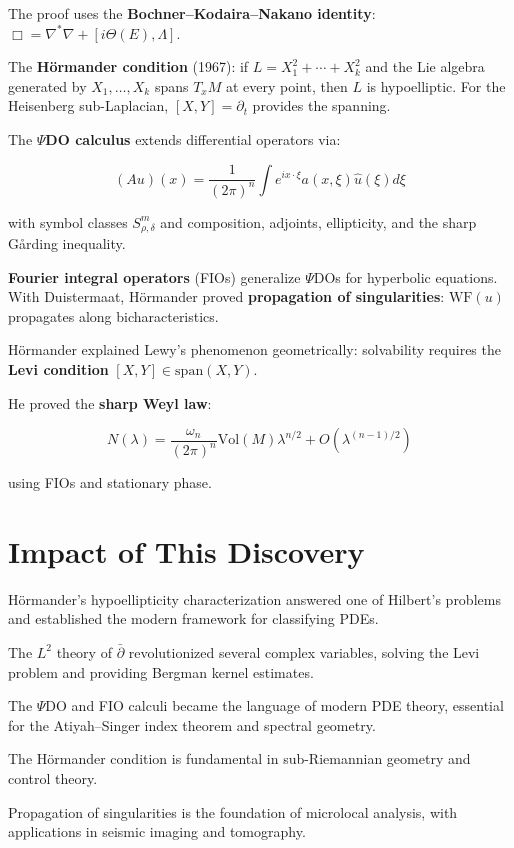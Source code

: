 The proof uses the \textbf{Bochner--Kodaira--Nakano identity}:
$\Box = \nabla^*\nabla + [i\Theta(E), \Lambda]$.

The \textbf{Hörmander condition} (1967): if $L = X_1^2 + \cdots + X_k^2$ and the
Lie algebra generated by $X_1, \ldots, X_k$ spans $T_xM$ at every point, then $L$
is hypoelliptic. For the Heisenberg sub-Laplacian, $[X,Y] = \partial_t$ provides
the spanning.

The \textbf{$\Psi$DO calculus} extends differential operators via:

\[(Au)(x) = \frac{1}{(2\pi)^n}\int e^{ix\cdot\xi} a(x,\xi) \hat{u}(\xi) d\xi\]

with symbol classes $S^m_{\rho,\delta}$ and composition, adjoints, ellipticity, and
the sharp Gårding inequality.

\textbf{Fourier integral operators} (FIOs) generalize $\Psi$DOs for hyperbolic
equations. With Duistermaat, Hörmander proved \textbf{propagation of
singularities}: $\text{WF}(u)$ propagates along bicharacteristics.

Hörmander explained Lewy's phenomenon geometrically: solvability requires the
\textbf{Levi condition} $[X,Y] \in \text{span}(X,Y)$.

He proved the \textbf{sharp Weyl law}:

\[N(\lambda) = \frac{\omega_n}{(2\pi)^n}\text{Vol}(M)\lambda^{n/2} + O(\lambda^{(n-1)/2})\]

using FIOs and stationary phase.

\section{Impact of This Discovery}

Hörmander's hypoellipticity characterization answered one of Hilbert's problems
and established the modern framework for classifying PDEs.

The $L^2$ theory of $\bar{\partial}$ revolutionized several complex variables,
solving the Levi problem and providing Bergman kernel estimates.

The $\Psi$DO and FIO calculi became the language of modern PDE theory, essential
for the Atiyah--Singer index theorem and spectral geometry.

The Hörmander condition is fundamental in sub-Riemannian geometry and control
theory.

Propagation of singularities is the foundation of microlocal analysis, with
applications in seismic imaging and tomography.

